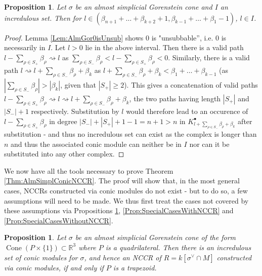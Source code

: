 \documentclass[reqno, 12pt]{amsart}
\newtheorem{proposition}[theorem]{Proposition}
\theoremstyle{definition}
\numberwithin{equation}{section}
\newcommand{\R}{\mathbb{R}}
\newcommand{\cone}{\operatorname{Cone}}
\begin{document}
\begin{proposition}
    \label{Prop:AlmGorUnsubinterval}
    Let $\sigma$ be an almost simplicial Gorenstein cone and $I$ an incredulous set. Then for $l\in (\beta_{n+1}+\dots+\beta_{k+2}+1,\beta_{k-1}+\dots+\beta_{1}-1)$, $l\in I$.
\end{proposition}
\begin{proof}
   Lemma \ref{Lem:AlmGor0isUnsub} shows 0 is "unsubbable'', i.e. $0$ is necessarily in $I$. Let $l>0$ lie in the above interval. Then there is a valid path $l-\sum_{\rho\in S_+}\beta_\rho\rightsquigarrow l$ as $\sum_{\rho\in S_-}\beta_\rho<l-\sum_{\rho\in S_+}\beta_\rho<0$. Similarly, there is a valid path $l\rightsquigarrow l+\sum_{\rho\in S_-}\beta_\rho+\beta_k$ as $l+\sum_{\rho\in S_-}\beta_\rho+\beta_k<\beta_1+\dots+\beta_{k-1}$ (as $|\sum_{\rho\in S_-}\beta_\rho|>|\beta_k|$, given that $|S_+|\ge 2$). This gives a concatenation of valid paths $l-\sum_{\rho\in S_+}\beta_\rho\rightsquigarrow l\rightsquigarrow l+\sum_{\rho\in S_-}\beta_\rho+\beta_k$, the two paths having length $|S_+|$ and $|S_-|+1$ respectively. Substitution by $l$ would therefore lead to an occurence of $l-\sum_{\rho\in S_+}\beta_\rho$ in degree $|S_-|+|S_+|+1-1=n+1>n$ in $K_{l+\sum_{\rho\in S_-}\beta_\rho+\beta_k}^{\bullet}$ after substitution -  and thus no incredulous set can exist as the complex is longer than $n$ and thus the associated conic module can neither be in $I$ nor can it be substituted into any other complex.
\end{proof}

We now have all the tools necessary to prove Theorem \ref{Thm:AlmSimplConicNCCR}. The proof will show that, in the most general cases, NCCRs constructed via conic modules do not exist -  but to do so, a few assumptions will need to be made. We thus first treat the cases not covered by these assumptions via Propositions \ref{Prop:3DAlmostSimp}, \ref{Prop:SpecialCasesWithNCCR} and \ref{Prop:SpecialCasesWithoutNCCR}.

\begin{proposition}
    \label{Prop:3DAlmostSimp}
    Let $\sigma$ be an almost simplicial Gorenstein cone of the form $\cone(P\times\{1\})\subset \R^3$ where $P$ is a quadrilateral. Then there is an incredulous set of conic modules for $\sigma$, and hence an NCCR of $R=k[\sigma^\vee\cap M]$ constructed via conic modules, if and only if $P$ is a trapezoid.
\end{proposition}
\end{document}
